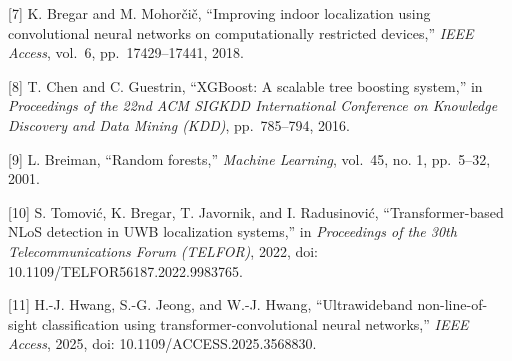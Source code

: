 \documentclass[12pt,a4paper]{article}
\begin{document}
{[}7{]} K. Bregar and M. Mohorčič, ``Improving indoor localization using
convolutional neural networks on computationally restricted devices,''
\emph{IEEE Access}, vol.~6, pp.~17429--17441, 2018.

{[}8{]} T. Chen and C. Guestrin, ``XGBoost: A scalable tree boosting
system,'' in \emph{Proceedings of the 22nd ACM SIGKDD International
Conference on Knowledge Discovery and Data Mining (KDD)}, pp.~785--794,
2016.

{[}9{]} L. Breiman, ``Random forests,'' \emph{Machine Learning},
vol.~45, no. 1, pp.~5--32, 2001.

{[}10{]} S. Tomović, K. Bregar, T. Javornik, and I. Radusinović,
``Transformer-based NLoS detection in UWB localization systems,'' in
\emph{Proceedings of the 30th Telecommunications Forum (TELFOR)}, 2022,
doi: 10.1109/TELFOR56187.2022.9983765.

{[}11{]} H.-J. Hwang, S.-G. Jeong, and W.-J. Hwang, ``Ultrawideband
non-line-of-sight classification using transformer-convolutional neural
networks,'' \emph{IEEE Access}, 2025, doi: 10.1109/ACCESS.2025.3568830.

\end{document}
